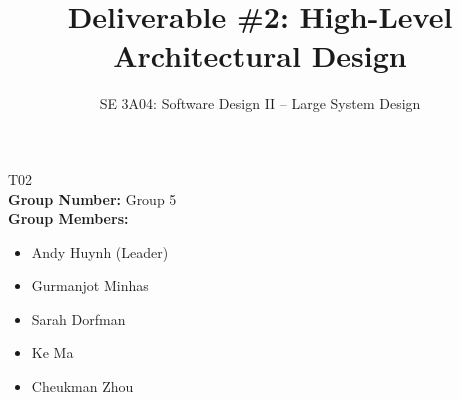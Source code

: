 \documentclass[]{article}
\title{Deliverable \#2: High-Level Architectural Design}
\author{SE 3A04: Software Design II -- Large System Design}
\date{}
\begin{document}
\maketitle	
{} T02\\
{\bf Group Number:} Group 5 \\
{\bf Group Members:} 
\begin{itemize}
	\item Andy Huynh (Leader)
	\item Gurmanjot Minhas
	\item Sarah Dorfman
	\item Ke Ma
	\item Cheukman Zhou
\end{itemize}

\newpage














\end{document}
